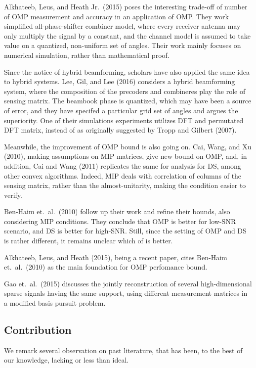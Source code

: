 \documentclass[12pt]{article}
\begin{document}
Alkhateeb, Leus, and Heath Jr.\ (2015) poses the interesting trade-off of number of OMP measurement and accuracy in an application of OMP.
They work simplified all-phase-shifter combiner model, where every receiver antenna may only multiply the signal by a constant, and the channel model is assumed to take value on a quantized, non-uniform set of angles.
Their work mainly focuses on numerical simulation, rather than mathematical proof.

Since the notice of hybrid beamforming, scholars have also applied the same idea to hybrid systems.
Lee, Gil, and Lee (2016) considers a hybrid beamforming system, where the composition of the precoders and combineres play the role of sensing matrix.
The beambook phase is quantized, which may have been a source of error, and they have specifed a particular grid set of angles and argues the superiority.
One of their simulations experiments utilizes DFT and permutated DFT matrix, instead of as originally suggested by Tropp and Gilbert (2007).

Meanwhile, the improvement of OMP bound is also going on.
Cai, Wang, and Xu (2010), making assumptions on MIP matrices, give new bound on OMP, and, in addition, Cai and Wang (2011) replicates the same for analysis for DS, among other convex algorithms.
Indeed, MIP deals with correlation of columns of the sensing matrix, rather than the almost-unitarity, making the condition easier to verify.

Ben-Haim et.\ al.\ (2010) follow up their work and refine their bounds, also considering MIP conditions.
They conclude that OMP is better for low-SNR scenario, and DS is better for high-SNR.
Still, since the setting of OMP and DS is rather different, it remains unclear which of is better.

Alkhateeb, Leus, and Heath (2015), being a recent paper, cites Ben-Haim et.\ al.\ (2010) as the main foundation for OMP perfomance bound.

Gao et.\ al.\ (2015) discusses the jointly reconstruction of several high-dimensional sparse signals having the same support, using different measurement matrices in a modified basis pursuit problem.

\subsection{Contribution}

We remark several observation on past literature, that has been, to the best of our knowledge, lacking or less than ideal.
\end{document}
